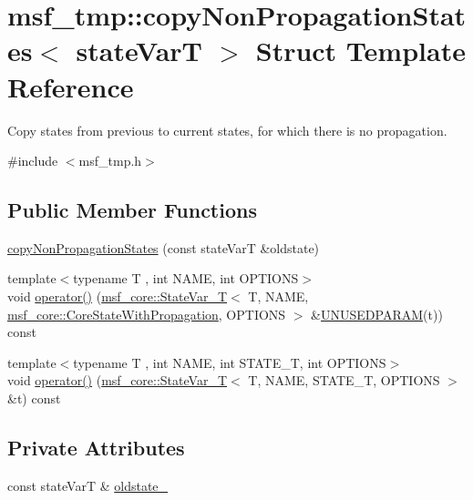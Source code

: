 \hypertarget{structmsf__tmp_1_1copyNonPropagationStates}{\section{msf\-\_\-tmp\-:\-:copy\-Non\-Propagation\-States$<$ state\-Var\-T $>$ Struct Template Reference}
\label{structmsf__tmp_1_1copyNonPropagationStates}
}


Copy states from previous to current states, for which there is no propagation.  




{\ttfamily \#include $<$msf\-\_\-tmp.\-h$>$}

\subsection*{Public Member Functions}
\begin{DoxyCompactItemize}
\item 
\hyperlink{structmsf__tmp_1_1copyNonPropagationStates_af80f8fe52f93fe2260e790378c7414fa}{copy\-Non\-Propagation\-States} (const state\-Var\-T \&oldstate)
\item 
{\footnotesize template$<$typename T , int N\-A\-M\-E, int O\-P\-T\-I\-O\-N\-S$>$ }\\void \hyperlink{structmsf__tmp_1_1copyNonPropagationStates_acd885c013431ce4fc1d9f78f768510d3}{operator()} (\hyperlink{structmsf__core_1_1StateVar__T}{msf\-\_\-core\-::\-State\-Var\-\_\-\-T}$<$ T, N\-A\-M\-E, \hyperlink{namespacemsf__core_a7250e8c11f743373771fc229011ae788a0c9bb148eede8a7954b42003c28db10b}{msf\-\_\-core\-::\-Core\-State\-With\-Propagation}, O\-P\-T\-I\-O\-N\-S $>$ \&\hyperlink{msf__macros_8h_a2d2af1048de7b1510994ffd3bc32aacc}{U\-N\-U\-S\-E\-D\-P\-A\-R\-A\-M}(t)) const 
\item 
{\footnotesize template$<$typename T , int N\-A\-M\-E, int S\-T\-A\-T\-E\-\_\-\-T, int O\-P\-T\-I\-O\-N\-S$>$ }\\void \hyperlink{structmsf__tmp_1_1copyNonPropagationStates_a752a5841f0ba47c8eee80d8dacdcc328}{operator()} (\hyperlink{structmsf__core_1_1StateVar__T}{msf\-\_\-core\-::\-State\-Var\-\_\-\-T}$<$ T, N\-A\-M\-E, S\-T\-A\-T\-E\-\_\-\-T, O\-P\-T\-I\-O\-N\-S $>$ \&t) const 
\end{DoxyCompactItemize}
\subsection*{Private Attributes}
\begin{DoxyCompactItemize}
\item 
const state\-Var\-T \& \hyperlink{structmsf__tmp_1_1copyNonPropagationStates_a58c1156738fad79c02bec4f3d5cd34b8}{oldstate\-\_\-}
\end{DoxyCompactItemize}


